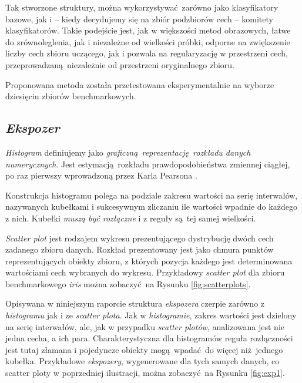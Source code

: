 \documentclass[]{article}
\begin{document}
Tak stworzone struktury, można wykorzystywać zarówno jako klasyfikatory bazowe, jak i -- kiedy decydujemy się na zbiór podzbiorów cech -- komitety klasyfikatorów. Takie podejście jest, jak w większości metod obrazowych, łatwe do zrównoleglenia, jak i niezależne od wielkości próbki, odporne na zwiększenie liczby cech zbioru uczącego, jak i pozwala na regularyzację w przestrzeni cech, przeprowadzaną niezależnie od przestrzeni oryginalnego zbioru.

Proponowana metoda została przetestowana eksperymentalnie na wyborze dziesięciu zbiorów benchmarkowych.

\subsection{\emph{Ekspozer}}
\label{exposer}

\emph{Histogram} definiujemy jako \emph{graficzną reprezentację rozkładu danych numerycznych}. Jest estymacją rozkładu prawdopodobieństwa zmiennej ciągłej, po raz pierwszy wprowadzoną przez Karla Pearsona \cite{1895RSPTA.186..343P}. 

Konstrukcja histogramu polega na podziale zakresu wartości na serię interwałów, nazywanych kubełkami i sukcesywnym zliczaniu ile wartości wpadnie do każdego z nich. Kubełki \emph{muszą być rozłączne} i z reguły są tej samej wielkości.

\emph{Scatter plot} jest rodzajem wykresu prezentującego dystrybucję dwóch cech zadanego zbioru danych. Rozkład prezentowany jest jako chmura punktów reprezentujących obiekty zbioru, z których pozycja każdego jest determinowana wartościami cech wybranych do wykresu\cite{jessica2005seeing}. Przykładowy \emph{scatter plot} dla zbioru benchmarkowego \emph{iris} można zobaczyć na Rysunku \ref{fig:scatterplots}.

Opisywana w niniejszym raporcie struktura \emph{ekspozera} czerpie zarówno z \emph{histogramu} jak i ze \emph{scatter plota}. Jak w \emph{histogramie}, zakres wartości jest dzielony na serię interwałów, ale, jak w przypadku \emph{scatter plotów}, analizowana jest nie jedna cecha, a ich para. Charakterystyczna dla histogramów reguła rozłączności jest tutaj złamana i pojedyncze obiekty mogą wpadać do więcej niż jednego kubełka. Przykładowe \emph{ekspozery}, wygenerowane dla tych samych danych, co scatter ploty w poprzedniej ilustracji, można zobaczyć na Rysunku \ref{fig:exp1}.
\end{document}
